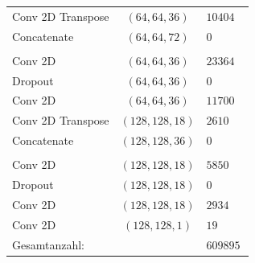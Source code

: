 \begin{table}
\begin{tabular}{l c l}
        Conv 2D Transpose & $(64, 64, 36)  $ & $10404 $ \\       
        Concatenate     & $(64, 64, 72)  $ & $0  $ \\                             
        & & \\             
        Conv 2D             & $(64, 64, 36)  $ & $23364 $ \\       
        Dropout             & $(64, 64, 36)  $ & $0  $ \\       
        Conv 2D              & $(64, 64, 36)  $ & $11700 $ \\       
        Conv 2D Transpose & $(128, 128, 18)$ & $2610  $ \\       
        Concatenate     & $(128, 128, 36)$ & $0  $ \\
        & & \\             
        Conv 2D             & $(128, 128, 18)$ & $5850  $ \\       
        Dropout             & $(128, 128, 18)$ & $0  $ \\       
        Conv 2D              & $(128, 128, 18)$ & $2934  $ \\       
        Conv 2D              & $(128, 128, 1) $ & $19 $ \\
        \hline
        Gesamtanzahl: & & $\SI{609895}{}$ \\
        \bottomrule
    \end{tabular}
\end{table}

\FloatBarrier

